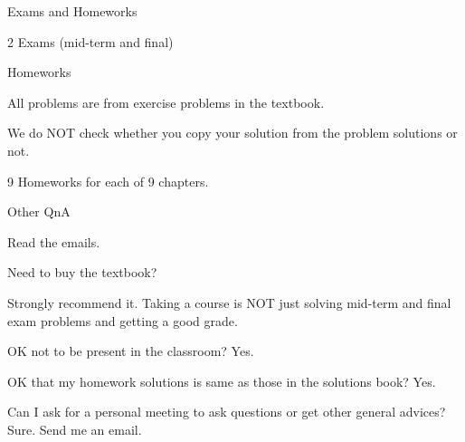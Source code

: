 






\begin{frame}{Exams and Homeworks}

\bci

\item 2 Exams (mid-term and final)

\item<2-> Homeworks

  \bci
     \item All problems are from exercise problems in the textbook.
       \item We do NOT check whether you copy your solution from the
         problem solutions or not. 
       \eci
  


\item<3-> 9 Homeworks for each of 9 chapters.

 

  \eci

\end{frame}

\begin{frame}{Other QnA}

\bci

\item<1->Read  the emails. 

\item<2-> Need to buy the textbook?

  \bci

\item<3-> Strongly recommend it. Taking a course is NOT just solving
  mid-term and final exam problems and getting a good grade. 
  \eci
  


\medskip
  
\item<4-> OK not to be present in the classroom? Yes.

  \item <5-> OK that my homework solutions is same as those in the
    solutions book? Yes.   

\item<6-> Can I ask for a personal meeting to ask questions or get
  other general advices? Sure. Send me an email.
  
    \eci

\end{frame}

